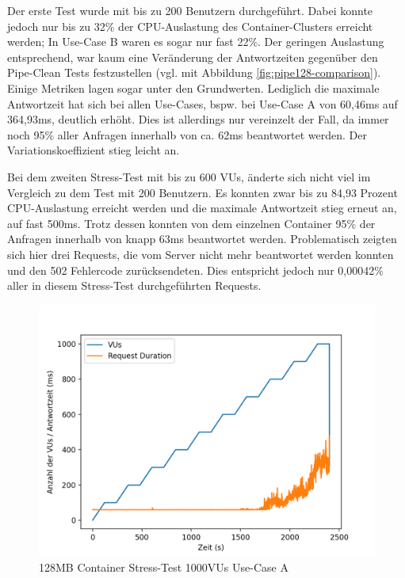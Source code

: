 Der erste Test wurde mit bis zu 200 Benutzern durchgeführt. Dabei konnte jedoch nur bis zu 32\% der CPU-Auslastung des Container-Clusters erreicht werden; In Use-Case B waren es sogar nur fast 22\%. Der geringen Auslastung entsprechend, war kaum eine Veränderung der Antwortzeiten gegenüber den Pipe-Clean Tests festzustellen (vgl. mit Abbildung \ref{fig:pipe128-comparison}). Einige Metriken lagen sogar unter den Grundwerten. Lediglich die maximale Antwortzeit hat sich bei allen Use-Cases, bspw. bei Use-Case A von 60,46ms auf 364,93ms, deutlich erhöht. Dies ist allerdings nur vereinzelt der Fall, da immer noch 95\% aller Anfragen innerhalb von ca. 62ms beantwortet werden. Der Variationskoeffizient stieg leicht an. 

Bei dem zweiten Stress-Test mit bis zu 600 VUs, änderte sich nicht viel im Vergleich zu dem Test mit 200 Benutzern. Es konnten zwar bis zu 84,93 Prozent CPU-Auslastung erreicht werden und die maximale Antwortzeit stieg erneut an, auf fast 500ms. Trotz dessen konnten von dem einzelnen Container 95\% der Anfragen innerhalb von knapp 63ms beantwortet werden. Problematisch zeigten sich hier drei Requests, die vom Server nicht mehr beantwortet werden konnten und den 502 Fehlercode zurücksendeten. Dies entspricht jedoch nur 0,00042\% aller in diesem Stress-Test durchgeführten Requests.

\begin{figure}[H]
    \includegraphics[width=\textwidth]{img/fargate128-stress1000.png}
    \caption[Container Stress-Test 1000VUs]{128MB Container Stress-Test 1000VUs Use-Case A}
    \label{fig:fargate128-stress1000}
\end{figure}


